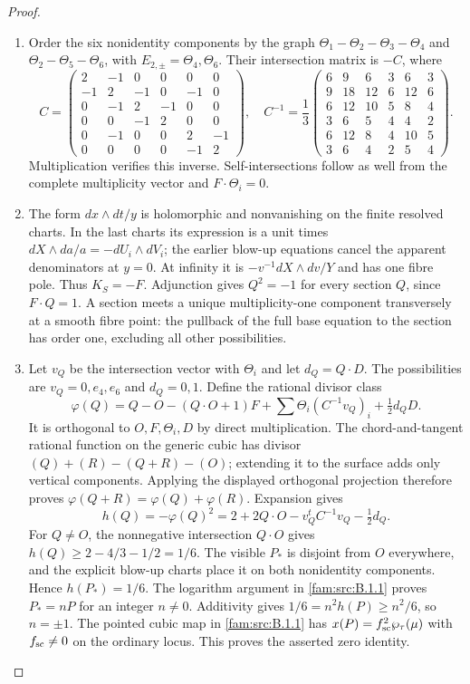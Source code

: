 \begin{proof}
\begin{enumerate}[label=\arabic*.,leftmargin=*]
\item Order the six nonidentity components by the graph
$\Theta_1-\Theta_2-\Theta_3-\Theta_4$ and $\Theta_2-\Theta_5-\Theta_6$, with $E_{2,\pm}=\Theta_4,\Theta_6$. Their intersection matrix is $-C$, where
\[
 C=\begin{pmatrix}2&-1&0&0&0&0\\-1&2&-1&0&-1&0\\0&-1&2&-1&0&0\\0&0&-1&2&0&0\\0&-1&0&0&2&-1\\0&0&0&0&-1&2\end{pmatrix},\quad
 C^{-1}=\frac13\begin{pmatrix}6&9&6&3&6&3\\9&18&12&6&12&6\\6&12&10&5&8&4\\3&6&5&4&4&2\\6&12&8&4&10&5\\3&6&4&2&5&4\end{pmatrix}.
\]
Multiplication verifies this inverse. Self-intersections follow as well from the complete multiplicity vector and $F\cdot\Theta_i=0$.

\item The form $dx\wedge dt/y$ is holomorphic and nonvanishing on the finite resolved charts. In the last charts its expression is a unit times $dX\wedge da/a=-dU_i\wedge dV_i$; the earlier blow-up equations cancel the apparent denominators at $y=0$. At infinity it is $-v^{-1}dX\wedge dv/Y$ and has one fibre pole. Thus $K_S=-F$. Adjunction gives $Q^2=-1$ for every section $Q$, since $F\cdot Q=1$. A section meets a unique multiplicity-one component transversely at a smooth fibre point: the pullback of the full base equation to the section has order one, excluding all other possibilities.

\item Let $v_Q$ be the intersection vector with $\Theta_i$ and let $d_Q=Q\cdot D$. The possibilities are $v_Q=0,e_4,e_6$ and $d_Q=0,1$. Define the rational divisor class
\[
 \varphi(Q)=Q-O-(Q\cdot O+1)F+\sum\Theta_i(C^{-1}v_Q)_i+\tfrac12d_QD.
\]
It is orthogonal to $O,F,\Theta_i,D$ by direct multiplication. The chord-and-tangent rational function on the generic cubic has divisor $(Q)+(R)-(Q+R)-(O)$; extending it to the surface adds only vertical components. Applying the displayed orthogonal projection therefore proves $\varphi(Q+R)=\varphi(Q)+\varphi(R)$. Expansion gives
\[
 h(Q)=-\varphi(Q)^2=2+2Q\cdot O-v_Q^tC^{-1}v_Q-\tfrac12d_Q.
\]
For $Q\ne O$, the nonnegative intersection $Q\cdot O$ gives $h(Q)\ge2-4/3-1/2=1/6$. The visible $P_*$ is disjoint from $O$ everywhere, and the explicit blow-up charts place it on both nonidentity components. Hence $h(P_*)=1/6$. The logarithm argument in \ref{fam:src:B.1.1} proves $P_*=nP$ for an integer $n\ne0$. Additivity gives $1/6=n^2h(P)\ge n^2/6$, so $n=\pm1$. The pointed cubic map in \ref{fam:src:B.1.1} has $x(P)=f_{\rm sc}^2\wp_\tau(\mu)$ with $f_{\rm sc}\ne0$ on the ordinary locus. This proves the asserted zero identity.
\end{enumerate}
\end{proof}
